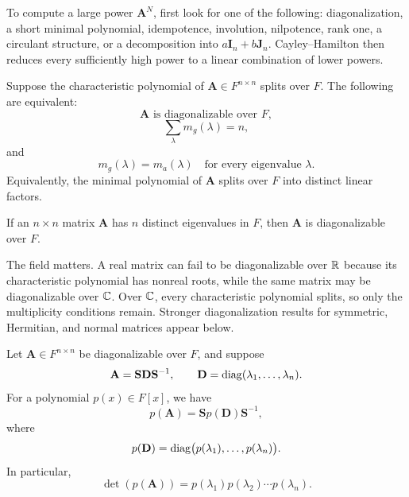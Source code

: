     \begin{strategy}
        To compute a large power $\mathbf{A}^N$, first look for one of the
        following: diagonalization, a short minimal polynomial, idempotence,
        involution, nilpotence, rank one, a circulant structure, or a decomposition
        into $a\mathbf{I}_n+b\mathbf{J}_n$. Cayley--Hamilton then reduces every
        sufficiently high power to a linear combination of lower powers.
    \end{strategy}



    \begin{theorem}
        Suppose the characteristic polynomial of
        $\mathbf{A}\in F^{n\times n}$ splits over $F$. The following are
        equivalent:
        \[
            \mathbf{A}\text{ is diagonalizable over }F,
        \]
        \[
            \sum_{\lambda}m_g(\lambda)=n,
        \]
        and
        \[
            m_g(\lambda)=m_a(\lambda)
            \quad\text{for every eigenvalue }\lambda.
        \]
        Equivalently, the minimal polynomial of $\mathbf{A}$ splits over $F$
        into distinct linear factors.
    \end{theorem}

    \begin{corollary}
        If an $n\times n$ matrix $\mathbf{A}$ has $n$ distinct eigenvalues in
        $F$, then $\mathbf{A}$ is diagonalizable over $F$.
    \end{corollary}

    \begin{remark}
        The field matters. A real matrix can fail to be diagonalizable over
        $\mathbb{R}$ because its characteristic polynomial has nonreal roots, while the
        same matrix may be diagonalizable over $\mathbb{C}$. Over $\mathbb{C}$, every
        characteristic polynomial splits, so only the multiplicity conditions
        remain. Stronger diagonalization results for symmetric, Hermitian, and
        normal matrices appear below.
    \end{remark}

    \begin{proposition}
        Let $\mathbf{A}\in F^{n\times n}$ be diagonalizable over $F$, and suppose
        \[
            \mathbf{A}
            =
            \mathbf{S}\mathbf{D}\mathbf{S}^{-1},
            \qquad
            \mathbf{D}
            =
            \operatorname{diag}(\lambda_1,\dots,\lambda_n).
        \]
        For a polynomial $p(x)\in F[x]$, we have
        \[
            p(\mathbf{A})
            =
            \mathbf{S}p(\mathbf{D})\mathbf{S}^{-1},
        \]
        where
        \[
            p(\mathbf{D})
            =
            \operatorname{diag}\bigl(p(\lambda_1),\dots,p(\lambda_n)\bigr).
        \]
        In particular,
        \[
            \det(p(\mathbf{A}))
            =
            p(\lambda_1)p(\lambda_2)\cdots p(\lambda_n).
        \]
    \end{proposition}

